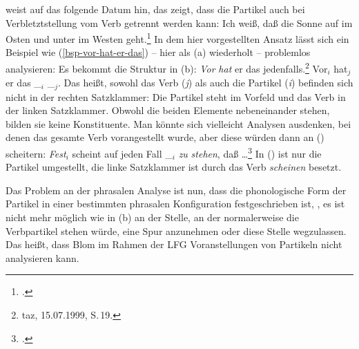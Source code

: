 \citet*[]{Luedeling2001a} weist auf das folgende Datum hin, das zeigt, dass die Partikel
auch bei Verbletztstellung vom Verb getrennt werden kann:
\ea
\label{ex-auf-im-osten-geht}
Ich weiß, daß die Sonne auf              im     Osten und unter               im     Westen geht.\footnote{
        .%
}
\z
In dem hier vorgestellten Ansatz lässt sich ein Beispiel wie (\ref{bsp-vor-hat-er-das})
-- hier als (a) wiederholt -- problemlos analysieren: Es bekommt die Struktur in (b):
\eal
\ex \label{bsp-vor-hat-er-das-zwei}
\emph{Vor} \emph{hat} er das jedenfalls.\footnote{
taz, 15.07.1999, S.\,19.
}
\ex Vor$_i$ hat$_j$ er das \_$_i$ \_$_j$.
\zl
Das heißt, sowohl das Verb (\emph{j}) als auch die Partikel (\emph{i}) befinden
sich nicht in der rechten Satzklammer: Die Partikel steht im Vorfeld und das Verb
in der linken Satzklammer. Obwohl die beiden Elemente nebeneinander stehen, bilden
sie keine Konstituente. Man könnte sich vielleicht Analysen ausdenken, bei denen
das gesamte Verb vorangestellt wurde, aber diese würden dann an () scheitern:
\ea 
\emph{Fest}$_i$ scheint auf jeden Fall \_$_i$ \emph{zu} \emph{stehen}, daß \ldots\footnote{
        .
       }
\z
In () ist nur die Partikel umgestellt, die linke Satzklammer ist durch das Verb \emph{scheinen}
besetzt. 

Das Problem an der phrasalen Analyse ist nun, dass die phonologische Form der Partikel in einer bestimmten
phrasalen Konfiguration festgeschrieben ist, \dash, es ist nicht mehr möglich wie in (b)
an der Stelle, an der normalerweise die Verbpartikel stehen würde, eine Spur anzunehmen
oder diese Stelle wegzulassen. Das heißt, dass Blom im Rahmen der LFG Voranstellungen
von Partikeln nicht analysieren kann.

